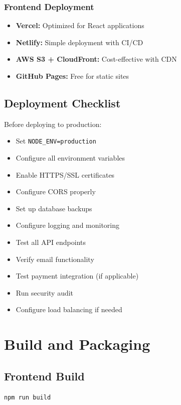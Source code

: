 \subsubsection{Frontend Deployment}

\begin{itemize}
    \item \textbf{Vercel:} Optimized for React applications
    \item \textbf{Netlify:} Simple deployment with CI/CD
    \item \textbf{AWS S3 + CloudFront:} Cost-effective with CDN
    \item \textbf{GitHub Pages:} Free for static sites
\end{itemize}

\subsection{Deployment Checklist}

Before deploying to production:

\begin{itemize}
    \item Set \texttt{NODE\_ENV=production}
    \item Configure all environment variables
    \item Enable HTTPS/SSL certificates
    \item Configure CORS properly
    \item Set up database backups
    \item Configure logging and monitoring
    \item Test all API endpoints
    \item Verify email functionality
    \item Test payment integration (if applicable)
    \item Run security audit
    \item Configure load balancing if needed
\end{itemize}

\section{Build and Packaging}

\subsection{Frontend Build}

\begin{verbatim}
npm run build
\end{verbatim}

